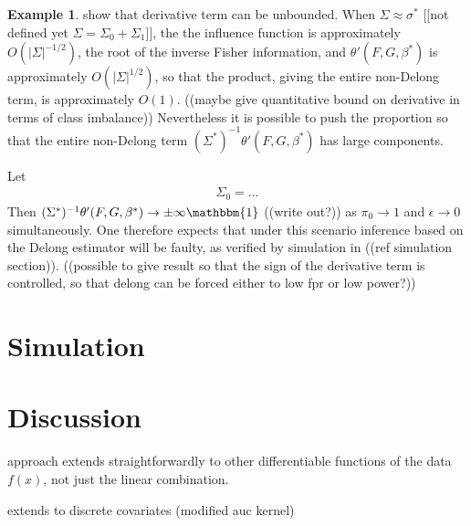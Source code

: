 \documentclass[12pt]{article}
\renewcommand{\star}[1]{{#1}^\ast}
\newcommand{\F}{F}
\newcommand{\G}{G}
\newcommand{\auc}{\theta}
\theoremstyle{definition}
\newtheorem{example}{Example}%
\begin{document}
\begin{example}
  show that derivative term can be unbounded. %
  When $\Sigma\approx\star\sigma$ [[not defined yet
  $\Sigma=\Sigma_0+\Sigma_1$]], the the influence function is
  approximately $O(|\Sigma|^{-1/2})$, the root of the inverse Fisher
  information, and $ \auc'(\F,\G,\star{\beta})$ is approximately
  $O(|\Sigma|^{1/2})$, so that the product, giving the entire
  non-Delong term, is approximately $O(1)$. ((maybe give quantitative bound on derivative in terms of class imbalance)) Nevertheless it is
  possible to push the proportion so that the entire non-Delong term
  $(\star{\Sigma})^{-1} \auc'(\F,\G,\star{\beta})$ has large
  components.

  Let
  \begin{align}
    \Sigma_0 = ...
  \end{align}
  Then $(\star{\Sigma})^{-1} \auc'(\F,\G,\star{\beta}) \to \pm \infty \mathbbm{1}$ ((write out?)) as $\pi_0 \to 1$ and $\epsilon\to 0$ simultaneously. One therefore expects that under this scenario inference based on the Delong estimator will be faulty, as verified by simulation in ((ref simulation section)). ((possible to give result so that the sign of the derivative term is controlled, so that delong can be forced either to low fpr or low power?))
  
\end{example}



\section{Simulation}


\section{Discussion}
approach extends straightforwardly to other differentiable functions
of the data $f(x)$, not just the linear combination.

extends to discrete covariates (modified auc kernel)
\end{document}
